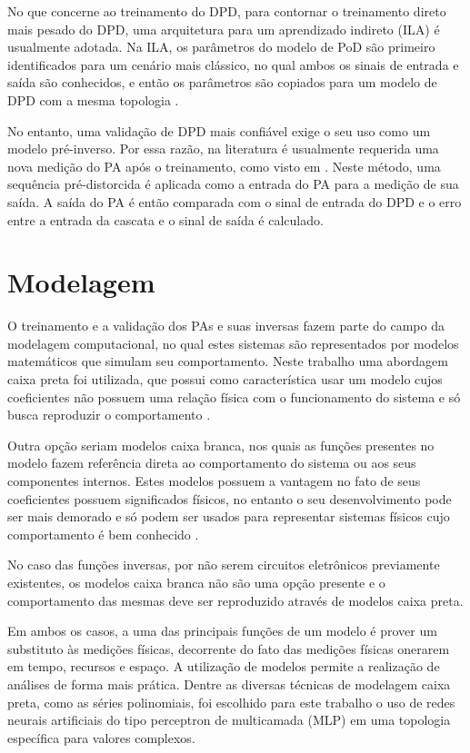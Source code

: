 No que concerne ao treinamento do DPD, para contornar o treinamento direto mais pesado do DPD, uma arquitetura para um aprendizado indireto (ILA) é usualmente adotada. Na ILA, os parâmetros do modelo de PoD são primeiro identificados para um cenário mais clássico, no qual ambos os sinais de entrada e saída são conhecidos, e então os parâmetros são copiados para um modelo de DPD com a mesma topologia \cite{changsoo_eun_new_1997}.

No entanto, uma validação de DPD mais confiável exige o seu uso como um modelo pré-inverso. Por essa razão, na literatura é usualmente requerida uma nova medição do PA após o treinamento, como visto em \cite{8891388}. Neste método, uma sequência pré-distorcida é aplicada como a entrada do PA para a medição de sua saída. A saída do PA é então comparada com o sinal de entrada do DPD e o erro entre a entrada da cascata e o sinal de saída é calculado.

\section{Modelagem} \label{sec:fundteo-model}
O treinamento e a validação dos PAs e suas inversas fazem parte do campo da modelagem computacional, no qual estes sistemas são representados por modelos matemáticos que simulam seu comportamento. Neste trabalho uma abordagem caixa preta foi utilizada, que possui como característica usar um modelo cujos coeficientes não possuem uma relação física com o funcionamento do sistema e só busca reproduzir o comportamento \cite{8882211}.

Outra opção seriam modelos caixa branca, nos quais as funções presentes no modelo fazem referência direta ao comportamento do sistema ou aos seus componentes internos. Estes modelos possuem a vantagem no fato de seus coeficientes possuem significados físicos, no entanto o seu desenvolvimento pode ser mais demorado e só podem ser usados para representar sistemas físicos cujo comportamento é bem conhecido \cite{8882211}.

No caso das funções inversas, por não serem circuitos eletrônicos previamente existentes, os modelos caixa branca não são uma opção presente e o comportamento das mesmas deve ser reproduzido através de modelos caixa preta.

Em ambos os casos, a uma das principais funções de um modelo é prover um substituto às medições físicas, decorrente do fato das medições físicas onerarem em tempo, recursos e espaço. A utilização de modelos permite a realização de análises de forma mais prática.
Dentre as diversas técnicas de modelagem caixa preta, como as séries polinomiais, foi escolhido para este trabalho o uso de redes neurais artificiais do tipo perceptron de multicamada (MLP) em uma topologia específica para valores complexos.


